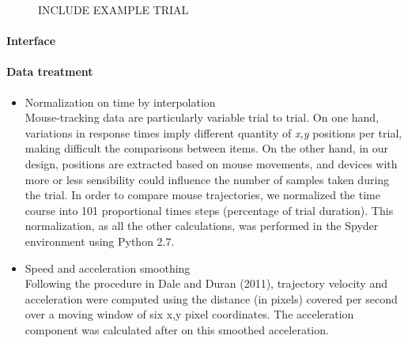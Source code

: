 \documentclass{article}
\begin{document}
\begin{figure}
\caption{INCLUDE EXAMPLE TRIAL}
\end{figure}

\paragraph{Interface}


\paragraph{Data treatment}


\begin{itemize}
\item Normalization on time by interpolation\\
Mouse-tracking data are particularly variable trial to trial. On one hand, variations in response times imply different quantity of \textit{x,y} positions per trial, making difficult the comparisons between items. On the other hand, in our design, positions are extracted based on mouse movements, and devices with more or less sensibility could influence the number of samples taken during the trial. In order to compare mouse trajectories, we normalized the time course into 101 proportional times steps (percentage of trial duration). This normalization, as all the other calculations, was performed in the Spyder environment using Python 2.7. 

\item Speed and acceleration smoothing\\
Following the procedure in Dale and Duran (2011), trajectory velocity and acceleration were computed using the distance (in pixels) covered per second over a moving window of six x,y pixel coordinates. The acceleration component was calculated after on this smoothed acceleration. 


\end{itemize}
\end{document}

